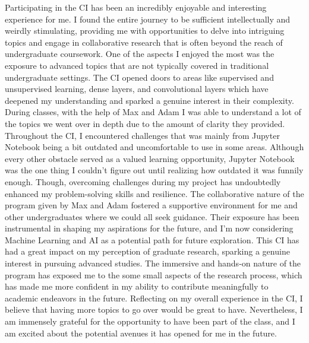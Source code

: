 \documentclass[paper=a4, fontsize=11pt,twoside]{scrartcl}
\begin{document}

Participating in the CI has been an incredibly enjoyable and interesting experience for me. I found the entire journey to be sufficient intellectually and weirdly stimulating, providing me with opportunities to delve into intriguing topics and engage in collaborative research that is often beyond the reach of undergraduate coursework. One of the aspects I enjoyed the most was the exposure to advanced topics that are not typically covered in traditional undergraduate settings. The CI opened doors to areas like supervised and unsupervised learning, dense layers, and convolutional layers which have deepened my understanding and sparked a genuine interest in their complexity. During classes, with the help of Max and Adam I was able to understand a lot of the topics we went over in depth due to the amount of clarity they provided. Throughout the CI, I encountered challenges that was mainly from Jupyter Notebook being a bit outdated and uncomfortable to use in some areas. Although every other obstacle served as a valued learning opportunity, Jupyter Notebook was the one thing I couldn't figure out until realizing how outdated it was funnily enough. Though, overcoming challenges during my project has undoubtedly enhanced my problem-solving skills and resilience. The collaborative nature of the program given by Max and Adam fostered a supportive environment for me and other undergraduates where we could all seek guidance. Their exposure has been instrumental in shaping my aspirations for the future, and I'm now considering Machine Learning and AI as a potential path for future exploration. This CI has had a great impact on my perception of graduate research, sparking a genuine interest in pursuing advanced studies. The immersive and hands-on nature of the program has exposed me to the some small aspects of the research process, which has made me more confident in my ability to contribute meaningfully to academic endeavors in the future. Reflecting on my overall experience in the CI, I believe that having more topics to go over would be great to have. Nevertheless, I am immensely grateful for the opportunity to have been part of the class, and I am excited about the potential avenues it has opened for me in the future. 
\end{document}
